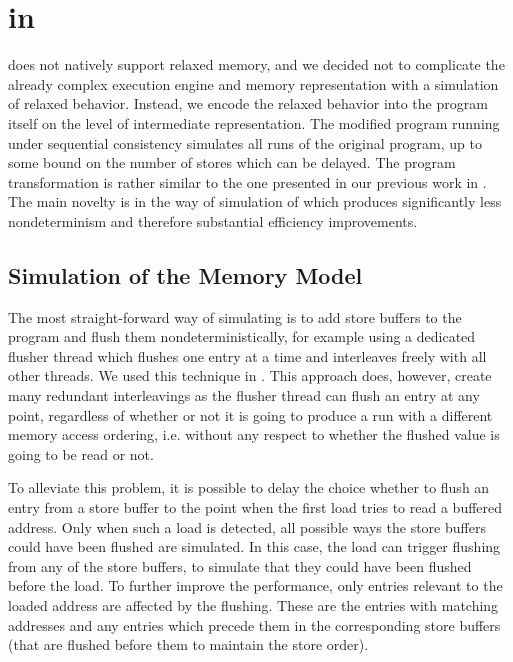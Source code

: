 
\section{\xtso in \divine}\label{sec:work}


\divine does not natively support relaxed memory, and we decided not to complicate the already complex execution engine and memory representation with a simulation of relaxed behavior.
Instead, we encode the relaxed behavior into the program itself on the level of \llvm intermediate representation.
The modified program running under sequential consistency simulates all \xtso runs of the original program, up to some bound on the number of stores which can be delayed.
The program transformation is rather similar to the one presented in our previous work in .
The main novelty is in the way of simulation of \xtso which produces significantly less nondeterminism and therefore substantial efficiency improvements.

\subsection{Simulation of the \xtso Memory Model}

The most straight-forward way of simulating \xtso is to add store buffers to the program and flush them nondeterministically, for example using a dedicated flusher thread which flushes one entry at a time and interleaves freely with all other threads.
We used this technique in .
This approach does, however, create many redundant interleavings as the flusher
thread can flush an entry at any point, regardless of whether or not it is going
to produce a run with a different memory access ordering, i.e. without any
respect to whether the flushed value is going to be read or not.

To alleviate this problem, it is possible to delay the choice whether to flush
an entry from a store buffer to the point when the first load tries to read a buffered address.
Only when such a load is detected, all possible ways the store buffers could have been flushed are simulated.
In this case, the load can trigger flushing from any of the store buffers, to simulate that they could have been flushed before the load.
To further improve the performance, only entries relevant to the loaded address
are affected by the flushing.
These are the entries with matching addresses and any entries which precede them in the corresponding store buffers (that are flushed before them to maintain the store order).

